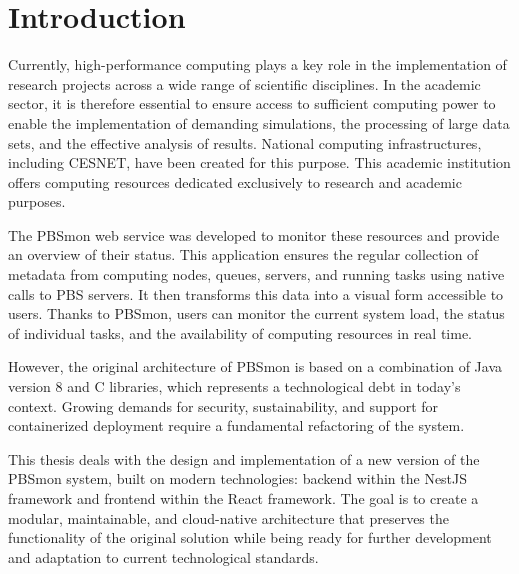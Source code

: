 \documentclass[
  digital,     %
  oneside,     %
  nosansbold,  %
  nocolorbold, %
  lof,         %
  lot,         %
]{fithesis4}
\begin{document}
\chapter*{Introduction}
Currently, high-performance computing plays a key role in the implementation of research projects across a wide range of scientific disciplines. In the academic sector, it is therefore essential to ensure access to sufficient computing power to enable the implementation of demanding simulations, the processing of large data sets, and the effective analysis of results. National computing infrastructures, including CESNET, have been created for this purpose. This academic institution offers computing resources dedicated exclusively to research and academic purposes.

The PBSmon web service was developed to monitor these resources and provide an overview of their status. This application ensures the regular collection of metadata from computing nodes, queues, servers, and running tasks using native calls to PBS servers. It then transforms this data into a visual form accessible to users. Thanks to PBSmon, users can monitor the current system load, the status of individual tasks, and the availability of computing resources in real time.

However, the original architecture of PBSmon is based on a combination of Java version 8 and C libraries, which represents a technological debt in today's context. Growing demands for security, sustainability, and support for containerized deployment require a fundamental refactoring of the system.


This thesis deals with the design and implementation of a new version of the PBSmon system, built on modern technologies: backend within the NestJS framework and frontend within the React framework. The goal is to create a modular, maintainable, and cloud-native architecture that preserves the functionality of the original solution while being ready for further development and adaptation to current technological standards.
\end{document}
